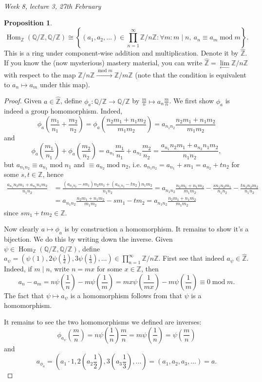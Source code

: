 \documentclass{article}
\newcommand{\Z}{\mathbb{Z}}
\newcommand{\Q}{\mathbb{Q}}
\newcommand{\Hom}{\operatorname{Hom}}
\newcommand{\Mod}{\operatorname{mod}}
\newcommand{\zhat}{\widehat{\Z}}
\theoremstyle{definition}
\newtheorem{prop}[defn]{Proposition}
\begin{document}
\begin{flushright}
\textit{Week 8, lecture 3, 27th February}
\end{flushright}

\begin{prop}
\[
\Hom_\Z(\Q/\Z,\Q/\Z)\cong\left\{(a_1,a_2,\ldots)\in\prod_{n=1}^\infty\Z/n\Z:\forall m:m\mid n,\ a_n\equiv a_m\Mod m\right\}.
\]
This is a ring under component-wise addition and multiplication. Denote it by $\zhat$. If you know the (now mysterious) mastery material, you can write $\zhat=\underset{\leftarrow}{\lim} \Z/n\Z$ with respect to the map $\Z/n\Z\xrightarrow{\Mod m}\Z/m\Z$ (note that the condition is equivalent to $a_n\mapsto a_m$ under this map).
\end{prop}
\begin{proof}
Given $a\in\zhat$, define $\phi_a:\Q/\Z\rightarrow\Q/\Z$ by $\frac{m}{n}\mapsto a_n\frac{m}{n}$. We first show $\phi_a$ is indeed a group homomorphism. Indeed,
\[
\phi_a\left(\frac{m_1}{n_1}+\frac{m_2}{n_2}\right)=\phi_a\left(\frac{n_2m_1+n_1m_2}{m_1m_2}\right)=a_{n_1n_2}\frac{n_2m_1+n_1m_2}{m_1m_2}
\]
and
\[
\phi_a\left(\frac{m_1}{n_1}\right)+\phi_a\left(\frac{m_2}{n_2}\right)=a_{n_1}\frac{m_1}{n_1}+a_{n_2}\frac{m_2}{n_2}=\frac{a_{n_1}n_2m_1+a_{n_2}n_1m_2}{n_1n_2},
\]
but $a_{n_1n_2}\equiv a_{n_1}\Mod n_1$ and $\equiv a_{n_2}\Mod n_2$, i.e. $a_{n_1n_2}=a_{n_1}+sn_1=a_{n_2}+tn_2$ for some $s,t\in\Z$, hence
\[
\begin{aligned}
\frac{a_{n_1}n_2m_1+a_{n_2}n_1m_2}{n_1n_2}&=\frac{(a_{n_1n_2}-sn_1)n_2m_1+(a_{n_1n_2}-tn_2)n_1m_2}{n_1n_2}=a_{n_1n_2}\frac{n_2m_1+n_1m_2}{m_1m_2}-\frac{sn_1n_2m_1}{n_1n_2}-\frac{tn_1n_2m_2}{n_1n_2}\\
&=a_{n_1n_2}\frac{n_2m_1+n_1m_2}{m_1m_2}-sm_1-tm_2=a_{n_1n_2}\frac{n_2m_1+n_1m_2}{m_1m_2}
\end{aligned}
\]
since $sm_1+tm_2\in\Z$.

Now clearly $a\mapsto\phi_a$ is by construction a homomorphism. It remains to show it's a bijection. We do this by writing down the inverse. Given $\psi\in\Hom_\Z(\Q/\Z,\Q/\Z)$, define $a_\psi=\left(\psi(1),2\psi\left(\frac12\right),3\psi\left(\frac13\right),\ldots\right)\in\prod_{n=1}^\infty\Z/n\Z$. First see that indeed $a_\psi\in\zhat$. Indeed, if $m\mid n$, write $n=mx$ for some $x\in\Z$, then
\[
a_n-a_m=n\psi\left(\frac1n\right)-m\psi\left(\frac1m\right)=mx\psi\left(\frac{1}{mx}\right)-m\psi\left(\frac1m\right)\equiv 0\Mod m .
\]
The fact that $\psi\mapsto a_\psi$ is a homomorphism follows from that $\psi$ is a homomorphism.

It remains to see the two homomorphisms we defined are inverses:
\[
\phi_{a_\psi}\left(\frac{m}{n}\right)=n\psi\left(\frac1n\right)\frac{m}{n}=m\psi\left(\frac1n\right)=\psi\left(\frac{m}{n}\right)
\]
and
\[
a_{\phi_a}=\left(a_1\cdot 1,2\left(a_2\frac12\right),3\left(a_3\frac13\right),\ldots\right)=(a_1,a_2,a_3,\ldots)=a.
\]
\end{proof}
\end{document}
